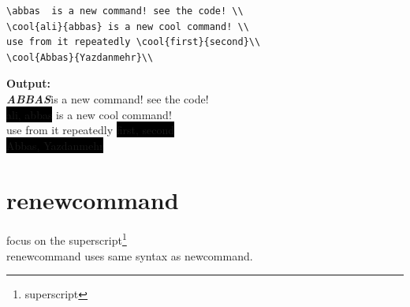 \documentclass{book}
\newcommand{\abbas}{\textcolor[rgb]{0.65,0.92,0.14}{\textbf{\emph{ABBAS}}}}
\newcommand{\myo}{\noindent\textbf{{\color{blue} Output}:\\}}
\newcommand{\cool}[2]{{\colorbox{black}{{\color{red} #1}, {\color{green} #2}}}}
\begin{document}
\begin{lstlisting}
\abbas  is a new command! see the code! \\
\cool{ali}{abbas} is a new cool command! \\
use from it repeatedly \cool{first}{second}\\
\cool{Abbas}{Yazdanmehr}\\
\end{lstlisting}

\myo
\abbas  is a new command! see the code! \\
\cool{ali}{abbas} is a new cool command! \\
use from it repeatedly \cool{first}{second}\\
\cool{Abbas}{Yazdanmehr}\\

\section{renewcommand}
focus on the superscript\footnote{superscript}\\
renewcommand uses same syntax as newcommand.
\end{document}

